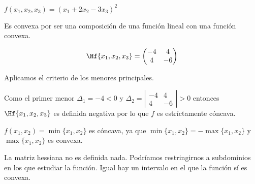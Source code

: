 \begin{problem}[3]

\ppart $f(x_1,x_2,x_3) = (x_1+2x_2 - 3x_3)^2$

\ppart

\solution

\spart Es convexa por ser una composición de una función lineal con una función convexa.


\ppart

\[
\Hf{x_1,x_2,x_3} = \begin{pmatrix}
-4&4\\4&-6
\end{pmatrix}
\]

Aplicamos el criterio de los menores principales.

Como el primer menor $\Delta_1 = -4 < 0$ y $\Delta_2 = \left|\begin{array}{cc}-4&4\\4&-6\end{array}\right| > 0$ entonces $\Hf{x_1,x_2,x_3}$ es definida negativa por lo que $f$ es estríctamente cóncava.


\ppart $f(x_1,x_2) = \min\{x_1,x_2\}$ es cóncava, ya que $\min\{x_1,x_2\} = -\max\{x_1,x_2\} $ y $\max\{x_1,x_2\}$ es convexa.

\ppart La matriz hessiana no es definida nada. Podríamos restringirnos a subdominios en los que estudiar la función. Igual hay un intervalo en el que la función sí es convexa.
\end{problem}


